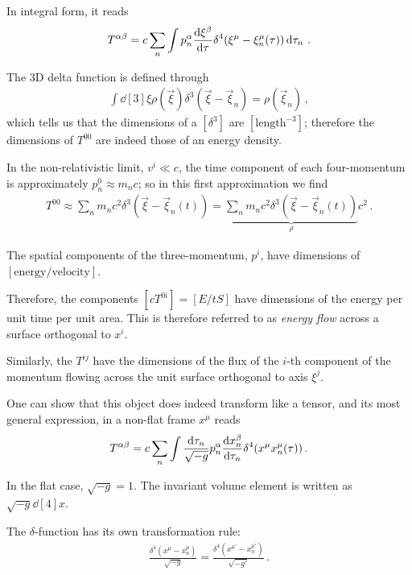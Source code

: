 \documentclass[main.tex]{subfiles}
\begin{document}
In integral form, it reads 
%
\begin{align}
T^{\alpha \beta } = c \sum _{n} \int p_n^\alpha \dv{\xi^{\beta }}{\tau } \delta^{4} (\xi^{\mu } - \xi^\mu _n (\tau )) \dd{\tau _n}
\,.
\end{align}

The 3D delta function is defined through 
%
\begin{align}
\int \dd[3]{\xi } \rho (\vec{\xi }) \delta^3 (\vec{\xi} - \vec{\xi}_n) = \rho (\vec{\xi}_n)
\,,
\end{align}
%
which tells us that the dimensions of a \([\delta^3]\) are \([\text{length}^{-3}]\); therefore the dimensions of \(T^{00}\) are indeed those of an energy density. 

In the non-relativistic limit, \(v^{i} \ll c\), the time component of each four-momentum is approximately \(p^{0}_n \approx m_n c\); so in this first approximation we find 
%
\begin{align}
T^{00} \approx \sum _{n} m_n c^2 \delta^3(\vec{\xi} - \vec{\xi}_n (t)) = \underbrace{\sum _{n} m_n c^2 \delta^3(\vec{\xi} - \vec{\xi}_n (t))}_{\rho } c^2
\,.
\end{align}

The spatial components of the three-momentum, \(p^{i}\), have dimensions of \([\text{energy} / \text{velocity}]\). 

Therefore, the components \([cT^{0i}] = [E / t S]\) have dimensions of the energy per unit time per unit area. 
This is therefore referred to as \emph{energy flow} across a surface orthogonal to \(x^{i}\). 

Similarly, the \(T^{ij}\) have the dimensions of the flux of the \(i\)-th component of the momentum flowing across the unit surface orthogonal to axis \(\xi^{j}\). 

One can show that this object does indeed transform like a tensor, and its most general expression, in a non-flat frame \(x^{\mu }\) reads 
%
\begin{align}
T^{\alpha \beta } = c \sum _{n} \int \frac{ \dd{\tau _n}}{\sqrt{-g}} p^{\alpha }_n \dv{x^{\beta }_n}{\tau _n} \delta^{4} (x^{\mu } x^{\mu }_n (\tau ))
\,.
\end{align}

In the flat case, \(\sqrt{-g} = 1\). 
The invariant volume element is written as \(\sqrt{-g} \dd[4]{x}\). 

The \(\delta \)-function has its own transformation rule: 
%
\begin{align}
\frac{ \delta^{4} (x^{\mu } - x^{\mu }_n)}{\sqrt{-g}} =
\frac{ \delta^{4} (x^{\mu \prime} - x^{\mu \prime}_n)}{\sqrt{-g'}} 
\,.
\end{align}
\end{document}
